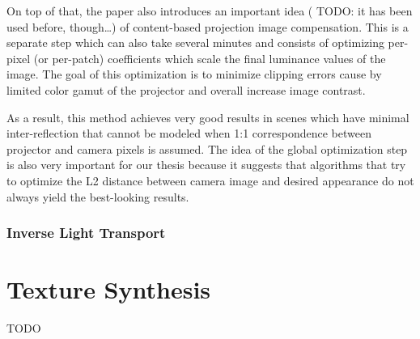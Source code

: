 On top of that, the paper also introduces an important idea ({\color{red} TODO: it has been used before, though\dots}) of content-based projection image compensation. This is a separate step which can also take several minutes and consists of optimizing per-pixel (or per-patch) coefficients which scale the final luminance values of the image. The goal of this optimization is to minimize clipping errors cause by limited color gamut of the projector and overall increase image contrast.

As a result, this method achieves very good results in scenes which have minimal inter-reflection that cannot be modeled when 1:1 correspondence between projector and camera pixels is assumed. The idea of the global optimization step is also very important for our thesis because it suggests that algorithms that try to optimize the L2 distance between camera image and desired appearance do not always yield the best-looking results.

\subsubsection{Inverse Light Transport}
\label{section:background-projection_mapping-procams-inverse_lt}

\section{Texture Synthesis}
\label{section:background-texture_synthesis}

{\color{red} TODO}